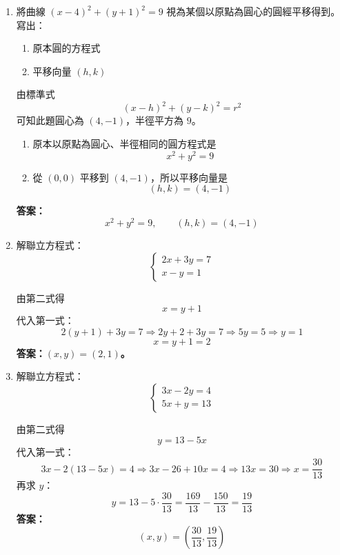 \documentclass[a4paper,12pt]{article}
\newenvironment{solutionbox}{\begin{framed}}{\end{framed}}
\begin{document}
\begin{enumerate}[label=\textbf{\arabic*.}, leftmargin=2em, itemsep=1.2em]
\begin{solutionbox}
平移就是座標分別相加：
\[
P'=(2+(-3),-1+5)=(-1,4)
\]
\textbf{答案：$P'(-1,4)$。}
\end{solutionbox}

\item 將曲線 $(x-4)^2 + (y+1)^2 = 9$ 視為某個以原點為圓心的圓經平移得到。寫出：

\begin{enumerate}[label=(\arabic*)]
\item 原本圓的方程式
\item 平移向量 $(h,k)$
\end{enumerate}

\begin{solutionbox}
由標準式
\[
(x-h)^2+(y-k)^2=r^2
\]
可知此題圓心為 $(4,-1)$，半徑平方為 $9$。

\begin{enumerate}[label=(\arabic*)]
\item 原本以原點為圓心、半徑相同的圓方程式是
\[
x^2+y^2=9
\]
\item 從 $(0,0)$ 平移到 $(4,-1)$，所以平移向量是
\[
(h,k)=(4,-1)
\]
\end{enumerate}

\textbf{答案：}
\[
x^2+y^2=9, \qquad (h,k)=(4,-1)
\]
\end{solutionbox}

\item 解聯立方程式：
\[
\begin{cases}
2x + 3y = 7 \\
x - y = 1
\end{cases}
\]

\begin{solutionbox}
由第二式得
\[
x=y+1
\]
代入第一式：
\[
2(y+1)+3y=7
\Rightarrow 2y+2+3y=7
\Rightarrow 5y=5
\Rightarrow y=1
\]
\[
x=y+1=2
\]
\textbf{答案：$(x,y)=(2,1)$。}
\end{solutionbox}

\item 解聯立方程式：
\[
\begin{cases}
3x - 2y = 4 \\
5x + y = 13
\end{cases}
\]

\begin{solutionbox}
由第二式得
\[
y=13-5x
\]
代入第一式：
\[
3x-2(13-5x)=4
\Rightarrow 3x-26+10x=4
\Rightarrow 13x=30
\Rightarrow x=\frac{30}{13}
\]
再求 $y$：
\[
y=13-5\cdot\frac{30}{13}
=\frac{169}{13}-\frac{150}{13}
=\frac{19}{13}
\]
\textbf{答案：}
\[
(x,y)=\left(\frac{30}{13},\frac{19}{13}\right)
\]
\end{solutionbox}

\end{enumerate}
\end{document}
